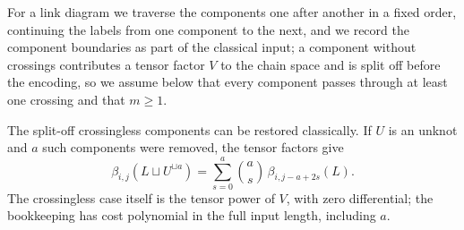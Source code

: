 \documentclass[a4paper,onecolumn,unpublished]{quantumarticle}
\theoremstyle{plain}
\theoremstyle{definition}
\theoremstyle{definition}
\numberwithin{equation}{section}
\begin{document}
For a link diagram we traverse the components one after another in a fixed order, continuing the labels from one component to the next, and we record the component boundaries as part of the classical input; a component without crossings contributes a tensor factor $V$ to the chain space and is split off before the encoding, so we assume below that every component passes through at least one crossing and that $m\ge 1$.
 

The split-off crossingless components can be restored classically. If $U$ is an unknot and $a$ such components were removed, the tensor factors give
\[
\beta_{i,j}(L\sqcup U^{\sqcup a})
=\sum_{s=0}^{a}\binom as\,\beta_{i,j-a+2s}(L).
\]
The crossingless case itself is the tensor power of $V$, with zero differential; the bookkeeping has cost polynomial in the full input length, including $a$.
\end{document}
